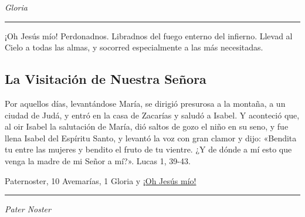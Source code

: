 \documentclass[a4paper,11pt, oneside]{report}
\begin{document}
\indent\textit{Gloria}

\begin{center}\rule{1\linewidth}{\linethickness}\end{center}

\hypertarget{finalAnunciacion}{¡Oh Jesús mío! Perdonadnos. Libradnos del fuego enterno del infierno. Llevad al Cielo a todas las almas, y socorred especialmente a las más 
necesitadas.}
  

\subsection*{La Visitación de Nuestra Señora}

Por aquellos días, levantándose María, se dirigió presurosa a la montaña, a un ciudad de Judá, y entró en la casa de Zacarías y saludó a Isabel.
Y aconteció que, al oir Isabel la salutación de María, dió saltos de gozo el niño en su seno, y fue llena Isabel del Espíritu Santo, y levantó la voz con gran
clamor y dijo: «Bendita tu entre las mujeres y bendito el fruto de tu vientre. ¿Y de dónde a mí esto que venga la madre de mi Señor a mí?». 
Lucas 1, 39-43.

 Paternoster, 10 Avemarías, 1 Gloria y \hyperlink{finalVisitacion}{¡Oh Jesús mío!}

\medskip

\begin{center}\rule{1\linewidth}{\linethickness}\end{center}

\medskip
\textit{Pater Noster} 
\end{document}
